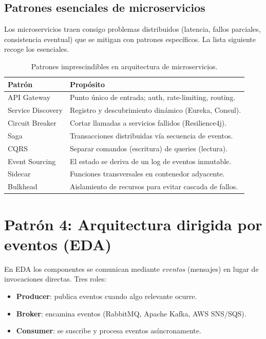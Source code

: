 \documentclass[11pt,a4paper,openany]{book}
\begin{document}
\subsection{Patrones esenciales de microservicios}

Los microservicios traen consigo problemas distribuidos
(latencia, fallos parciales, consistencia eventual) que se mitigan
con patrones específicos. La lista siguiente recoge los esenciales.


\begin{table}[htbp]
\centering
\caption{Patrones imprescindibles en arquitectura de microservicios.}
\footnotesize
\begin{tabularx}{\textwidth}{lX}
\toprule
\textbf{Patrón} & \textbf{Propósito}\\
\midrule
API Gateway & Punto único de entrada; auth, rate-limiting, routing.\\
Service Discovery & Registro y descubrimiento dinámico (Eureka, Consul).\\
Circuit Breaker & Cortar llamadas a servicios fallidos (Resilience4j).\\
Saga & Transacciones distribuidas vía secuencia de eventos.\\
CQRS & Separar comandos (escritura) de queries (lectura).\\
Event Sourcing & El estado se deriva de un log de eventos inmutable.\\
Sidecar & Funciones transversales en contenedor adyacente.\\
Bulkhead & Aislamiento de recursos para evitar cascada de fallos.\\
\bottomrule
\end{tabularx}
\end{table}

\section{Patrón 4: Arquitectura dirigida por eventos (EDA)}

En EDA los componentes se comunican mediante \emph{eventos}
(mensajes) en lugar de invocaciones directas. Tres roles:

\begin{itemize}
\item \textbf{Producer}: publica eventos cuando algo relevante ocurre.
\item \textbf{Broker}: encamina eventos (RabbitMQ, Apache Kafka, AWS
SNS/SQS).
\item \textbf{Consumer}: se suscribe y procesa eventos
asíncronamente.
\end{itemize}
\end{document}
